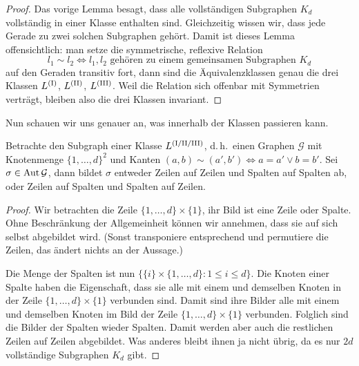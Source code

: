 \begin{proof}
Das vorige Lemma besagt, dass alle vollständigen Subgraphen $K_d$ vollständig in einer Klasse enthalten sind. Gleichzeitig wissen wir, dass jede Gerade zu zwei solchen Subgraphen gehört. Damit ist dieses Lemma offensichtlich: man setze die symmetrische, reflexive Relation
\begin{equation*}
l_1 \sim l_2 \Longleftrightarrow l_1, l_2 \text{ gehören zu einem gemeinsamen Subgraphen } K_d
\end{equation*}
auf den Geraden transitiv fort, dann sind die Äquivalenzklassen genau die drei Klassen $\Lcl(I)$, $\Lcl(II)$, $\Lcl(III)$. Weil die Relation sich offenbar mit Symmetrien verträgt, bleiben also die drei Klassen invariant.
\end{proof}

Nun schauen wir uns genauer an, was innerhalb der Klassen passieren kann.
\begin{lemma}
Betrachte den Subgraph einer Klasse $\Lcl(I/II/III)$, d.\,h.~einen Graphen $\mathcal G$ mit Knotenmenge $\{1,\dots,d\}^2$ und Kanten $(a,b) \sim (a',b') \Longleftrightarrow a=a' \vee b=b'$. Sei $\sigma \in \operatorname{Aut} \mathcal G$, dann bildet $\sigma$ entweder Zeilen auf Zeilen und Spalten auf Spalten ab, oder Zeilen auf Spalten und Spalten auf Zeilen.
\end{lemma}
\begin{proof}
Wir betrachten die Zeile $\{1,\dots,d\} \times \{1\}$, ihr Bild ist eine Zeile oder Spalte. Ohne Beschränkung der Allgemeinheit können wir annehmen, dass sie auf sich selbst abgebildet wird. (Sonst transponiere entsprechend und permutiere die Zeilen, das ändert nichts an der Aussage.)

Die Menge der Spalten ist nun $\{\{i\} \times \{1,\dots,d\} : 1 \leq i \leq d\}$. Die Knoten einer Spalte haben die Eigenschaft, dass sie alle mit einem und demselben Knoten in der Zeile $\{1,\dots,d\} \times \{1\}$ verbunden sind. Damit sind ihre Bilder alle mit einem und demselben Knoten im Bild der Zeile $\{1,\dots,d\} \times \{1\}$ verbunden. Folglich sind die Bilder der Spalten wieder Spalten. Damit werden aber auch die restlichen Zeilen auf Zeilen abgebildet. Was anderes bleibt ihnen ja nicht übrig, da es nur $2d$ vollständige Subgraphen $K_d$ gibt.
\end{proof}


